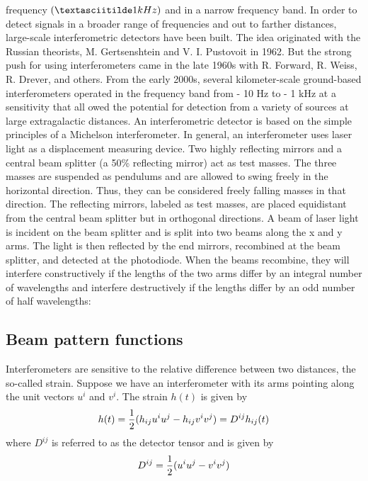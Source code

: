 \documentclass[binding=0.6cm, LaM]{sapthesis}
\begin{document}
 frequency $(\textasciitilde 1 kHz)$ and in a narrow frequency band. In order to detect signals in a broader range of frequencies and out to farther distances, large-scale interferometric detectors
 have been built. The idea originated with the Russian theorists, M. Gertsenshtein and V. I. Pustovoit in 1962. But the strong push for using interferometers came in the late 1960s with 
R. Forward, R. Weiss, R. Drever, and others. From the early 2000s, several kilometer-scale ground-based interferometers operated in the frequency band from - 10 Hz to - 1 kHz at a sensitivity that all
owed the potential for detection from a variety of sources at large extragalactic distances.
An interferometric detector is based on the simple principles of a Michelson interferometer. In general, an interferometer uses laser light as a displacement measuring device. 
Two highly reflecting mirrors and a central beam splitter (a 50\% reflecting mirror) act as test masses. The three masses are suspended as pendulums and are allowed to swing freely in the horizontal
 direction. Thus, they can be considered freely falling masses in that direction. The reflecting mirrors,  labeled as test masses, are placed equidistant from the central beam splitter but in 
orthogonal directions.
A beam of laser light is incident on the beam splitter and is split into two beams along the x and y arms. The light is then reflected by the end mirrors, recombined at the beam splitter,
 and detected at the photodiode. When the beams recombine, they will interfere constructively if the lengths of the two arms differ by an integral number of wavelengths and interfere destructively 
if the lengths differ by an odd number of half wavelengths:
%
\subsection{Beam pattern functions}

Interferometers are sensitive to the relative difference between two distances, the so-called strain.
 Suppose we have an interferometer with its arms pointing along the unit vectors $u^i$ and $v^i$. The strain $h(t)$ is given by
\begin{equation}
h(t) = {1 \over 2} (h_{ij}u^iu^j - h_{ij}v^iv^j) = D^{ij}h_{ij}(t)
\end{equation}
where $D^{ij}$ is referred to as the detector tensor and is given by
\begin{equation}
D^{ij} = {1\over 2} (u^iu^j -v^iv^j)
\end{equation}
\end{document}
